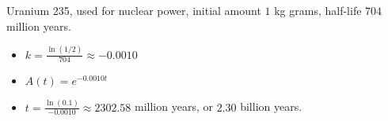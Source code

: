 {Uranium 235, used for nuclear power, initial amount $1$ kg grams, half-life  $704$ million years. \label{radioactivelast}}
{\begin{itemize}  \item $k = \frac{\ln(1/2)}{704} \approx -0.0010$

\item $A(t) = e^{-0.0010t}$

\item $t = \frac{\ln(0.1)}{-0.0010} \approx 2302.58$ million years, or $2.30$ billion years.

\end{itemize}}